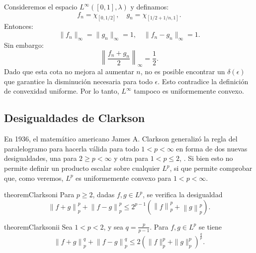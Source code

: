 \begin{example}
    Consideremos el espacio \(L^\infty([0,1], \lambda)\) y definamos:
    \begin{equation}
        f_n = \chi_{[0,1/2]}, \quad g_n = \chi_{[1/2 + 1/n,1]}.
    \end{equation}
    Entonces:
    \begin{equation}
        \|f_n\|_\infty = \|g_n\|_\infty = 1, \quad \|f_n - g_n\|_\infty = 1.
    \end{equation}
    Sin embargo:
    \begin{equation}
        \left\|\frac{f_n + g_n}{2}\right\|_\infty = \frac{1}{2}.
    \end{equation}
Dado que esta cota no mejora al aumentar \(n\), no es posible encontrar un \(\delta(\epsilon)\) que garantice la disminución necesaria para todo \(\epsilon\). Esto contradice la definición de convexidad uniforme.  
Por lo tanto, \(L^\infty\) tampoco es uniformemente convexo.  
\end{example}

\subsection{Desigualdades de Clarkson}
En 1936, el matemático americano James A. Clarkson generalizó la regla del paralelogramo para hacerla válida para todo $ 1 < p < \infty $ en forma de dos nuevas desigualdades, una para $ 2 \geq p < \infty $ y otra para $ 1 < p \leq 2 $, \cite{clarkson}. Si bien esto no permite definir un producto escalar sobre cualquier $ L^p $, si que permite comprobar que, como veremos, $ L^p $ es uniformemente convexo para $ 1 < p < \infty $.

\begin{restatable}{theorem}{Clarksoni} \label{thm:clarkson-1}
    Para $ p \geq 2 $, dadas $ f, g \in L^p $, se verifica la desigualdad
    \begin{equation} \label{eq:clarkson-1}
        \left\| f+g \right\|_p^p + \left\| f-g \right\|_p^p \leq 2^{p-1} \left( \left\|f\right\|_p^p + \left\|g\right\|_p^p \right).
    \end{equation}
\end{restatable}

\begin{restatable}{theorem}{Clarksonii} \label{thm:clarkson-2}
    Sea $ 1 < p < 2 $, y sea $ q = \frac{p}{p-1}$. Para $ f, g \in L^p $ se tiene
    \begin{equation} \label{eq:clarkson-2}
        \left\| f + g \right\|_p^q + \left\| f - g \right\|_p^q \leq 2 \left(\|f \|_p^p + \|g\|_p^p \right)^{\frac{q}{p}}.
    \end{equation}
\end{restatable}

